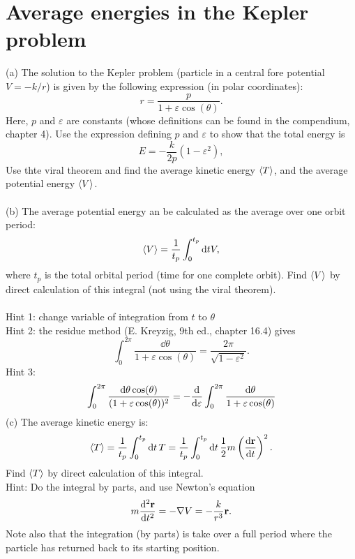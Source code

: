 \documentclass{article}
\begin{document}
    \section{Average energies in the Kepler problem}
        (a) The solution to the Kepler problem (particle in a central fore potential $V = -k/r$) is given by the following expression (in polar coordinates):
        \begin{equation*}
            r = \frac{p}{1 + \varepsilon \cos(\theta)}.
        \end{equation*}
        Here, $p$ and $\varepsilon$ are constants (whose definitions can be found in the compendium, chapter 4). Use the expression defining $p$ and $\varepsilon$ to show that the total energy is 
        \begin{equation*}
            E = - \frac{k}{2p}(1 - \varepsilon^2),
        \end{equation*}
        Use thte viral theorem and find the average kinetic energy $\expectationvalue{T}$, and the average potential energy $\expectationvalue{V}$. \\ \\
        (b) The average potential energy an be calculated as the average over one orbit period:
        \begin{equation*}
            \expval{V} = \frac{1}{t_p} \int_0^{t_p} \dd t V,
        \end{equation*}
        where $t_p$ is the total orbital period (time for one complete orbit). Find $\expval{V}$ by direct calculation of this integral (not using the viral theorem). \\ \\
        Hint 1: change variable of integration from $t$ to $\theta$\\
        Hint 2: the residue method (E. Kreyzig, 9th ed., chapter 16.4) gives
        \begin{equation*}
            \int_0^{2\pi} \frac{\dd \theta}{1 + \varepsilon \cos(\theta)} = \frac{2 \pi}{\sqrt{1 - \varepsilon^2}}.
        \end{equation*}
        Hint 3: 
        \begin{equation*}
            \int_0^{2\pi} \frac{\dd \theta \cos(\theta)}{(1 + \varepsilon \cos(\theta))^2} = - \dv{\varepsilon} \int_0^{2\pi} \frac{\dd \theta}{1 + \varepsilon \cos(\theta)}  
        \end{equation*}
        (c) The average kinetic energy is:
        \begin{equation*}
            \expval{T} = \frac{1}{t_p} \int_0^{t_p} \dd t\, T = \frac{1}{t_p} \int_0^{t_p} \dd t \, \frac{1}{2} m \left(\dv{\mathbf{r}}{t}\right)^2.
        \end{equation*}
        Find $\expval{T}$ by direct calculation of this integral. \\
        Hint: Do the integral by parts, and use Newton's equation
        \begin{equation*}
            m \dv[2]{\mathbf{r}}{t} = - \nabla V = - \frac{k}{r^3} \mathbf{r}.
        \end{equation*}
        Note also that the integration (by parts) is take over a full period where the particle has returned back to its starting position.
\end{document}

